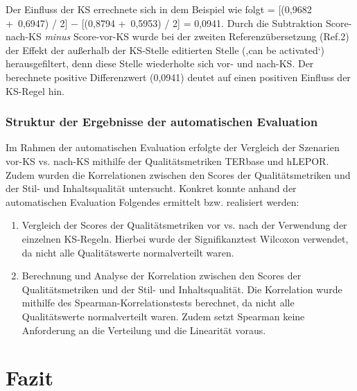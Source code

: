 \hspace*{-3pt}Der Einfluss der KS errechnete sich in dem Beispiel wie folgt = [(0,9682 +~0,6947) / 2] $-$ [(0,8794 +~0,5953) / 2] = 0,0941. Durch die Subtraktion Score-nach-KS \textit{minus} Score-vor-KS wurde bei der zweiten Referenzübersetzung (Ref.2) der Effekt der außerhalb der KS-Stelle editierten Stelle (‚can be activated‘) herausgefiltert, denn diese Stelle wiederholte sich vor- und nach-KS. Der berechnete positive Differenzwert (0,0941) deutet auf einen positiven Einfluss der KS-Regel hin.


\subsubsection{\label{sec:4.4.6.5}Struktur der Ergebnisse der automatischen Evaluation}

Im Rahmen der automatischen Evaluation erfolgte der Vergleich der Szenarien vor-KS vs. nach-KS mithilfe der Qualitätsmetriken TERbase und hLEPOR. Zudem wurden die Korrelationen zwischen den Scores der Qualitätsmetriken und der Stil- und Inhaltsqualität untersucht. Konkret konnte anhand der automatischen Evaluation Folgendes ermittelt bzw. realisiert werden:

\begin{enumerate}[label = {(\arabic*)}, align = left]
\item Vergleich der Scores der Qualitätsmetriken vor vs. nach der Verwendung der einzelnen KS-Regeln. Hierbei wurde der Signifikanztest Wilcoxon verwendet, da nicht alle Qualitätswerte normalverteilt waren.
\item Berechnung und Analyse der Korrelation zwischen den Scores der Qualitätsmetriken und der Stil- und Inhaltsqualität. Die Korrelation wurde mithilfe des Spearman-Korrelationstests berechnet, da nicht alle Qualitätswerte normalverteilt waren. Zudem setzt Spearman keine Anforderung an die Verteilung und die Linearität voraus.
\end{enumerate}


\section{\label{sec:4.5}{{Fazit}}}

